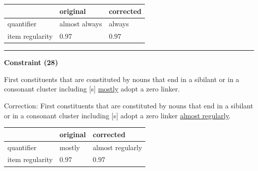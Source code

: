 \vspace{-0.25em}

\begin{table}[!ht]

\begin{center}

\begin{tabularx}{\columnwidth}{|X|X|X|}
      \hline
                        & original      & corrected \\
      \hline
      quantifier        & almost always      & always   \\
      \hline
      item regularity   & $0.97$      & $0.97$   \\
      \hline
\end{tabularx}
\end{center}
\end{table}

\vspace{-0.75em}
\hrule



\vspace{0.6em}

\begin{center}
\textbf{Constraint (28)}
\end{center}

\noindent
First constituents that are constituted by nouns that end in a sibilant or in a consonant cluster including [s] \underline{mostly} adopt a zero linker.
\vspace{0.3em}

\noindent
Correction: First constituents that are constituted by nouns that end in a sibilant or in a consonant cluster including [s] adopt a zero linker \underline{almost regularly}.

\vspace{-0.25em}

\begin{table}[!ht]

\begin{center}

\begin{tabularx}{\columnwidth}{|X|X|X|}
      \hline
                        & original      & corrected \\
      \hline
      quantifier        & mostly      & almost regularly   \\
      \hline
      item regularity   & $0.97$      & $0.97$   \\
      \hline
\end{tabularx}
\end{center}
\end{table}

